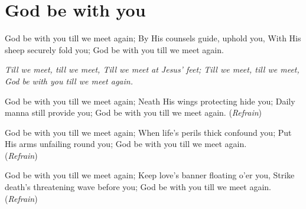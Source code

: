 \starttocol
\chapter{God be with you}
\nexttocol
\hfill{\it }
\stoptocol
\starttocol
\startlines
{\sc God} be with you till we meet again;
By His counsels guide, uphold you,
With His sheep securely fold you;
God be with you till we meet again.

{\it
Till we meet, till we meet,
Till we meet at Jesus' feet;
Till we meet, till we meet,
God be with you till we meet again.}

God be with you till we meet again;
Neath His wings protecting hide you;
Daily manna still provide you;
God be with you till we meet again.
          \hfill({\it Refrain})~~~~~~~~~

God be with you till we meet again;
When life's perils thick confound you;
Put His arms unfailing round you;
God be with you till we meet again.
          \hfill({\it Refrain})~~~~~~~~~

God be with you till we meet again;
Keep love's banner floating o'er you,
Strike death's threatening wave before you;
God be with you till we meet again.
          \hfill({\it Refrain})~~~~~~~~~
\stoplines
\nexttocol

\stoptocol

